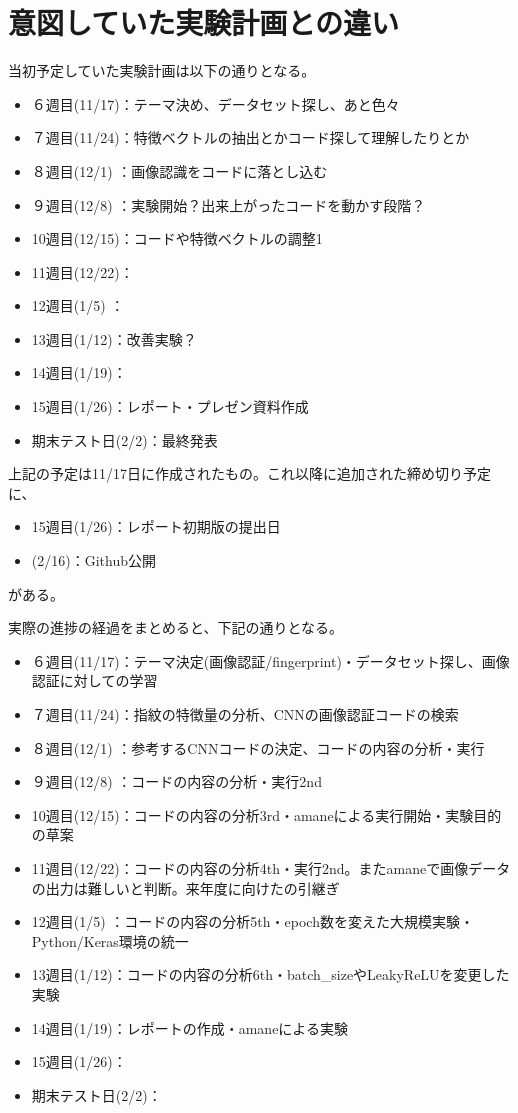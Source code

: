 \documentclass[a4paper, 11pt, titlepage]{jsarticle}
\begin{document}
\section{意図していた実験計画との違い}
当初予定していた実験計画は以下の通りとなる。
\begin{itemize}
\item	６週目(11/17)：テーマ決め、データセット探し、あと色々
\item	７週目(11/24)：特徴ベクトルの抽出とかコード探して理解したりとか
\item	８週目(12/1)  ：画像認識をコードに落とし込む
\item	９週目(12/8)  ：実験開始？出来上がったコードを動かす段階？
\item	10週目(12/15)：コードや特徴ベクトルの調整1
\item	11週目(12/22)：
\item	12週目(1/5)  ：
\item	13週目(1/12)：改善実験？
\item	14週目(1/19)：
\item	15週目(1/26)：レポート・プレゼン資料作成
\item	期末テスト日(2/2)：最終発表
\end{itemize}
上記の予定は11/17日に作成されたもの。これ以降に追加された締め切り予定に、
\begin{itemize}
\item	15週目(1/26)：レポート初期版の提出日
\item	(2/16)：Github公開
\end{itemize}
がある。

実際の進捗の経過をまとめると、下記の通りとなる。
\begin{itemize}
\item	６週目(11/17)：テーマ決定(画像認証/fingerprint)・データセット探し、画像認証に対しての学習
\item	７週目(11/24)：指紋の特徴量の分析、CNNの画像認証コードの検索
\item	８週目(12/1)  ：参考するCNNコードの決定、コードの内容の分析・実行%
\item	９週目(12/8)  ：コードの内容の分析・実行2nd
\item	10週目(12/15)：コードの内容の分析3rd・amaneによる実行開始・実験目的の草案
\item	11週目(12/22)：コードの内容の分析4th・実行2nd。またamaneで画像データの出力は難しいと判断。来年度に向けたの引継ぎ
\item	12週目(1/5)  ：コードの内容の分析5th・epoch数を変えた大規模実験・Python/Keras環境の統一
\item	13週目(1/12)：コードの内容の分析6th・batch\_sizeやLeakyReLUを変更した実験
\item	14週目(1/19)：レポートの作成・amaneによる実験
\item	15週目(1/26)：
\item	期末テスト日(2/2)：
\end{itemize}
\end{document}
